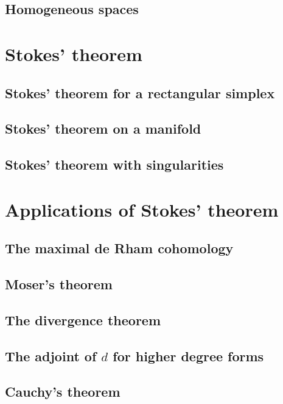 \documentclass[a4paper]{article}
\begin{document}
\subsection{Homogeneous spaces}

\section{Stokes' theorem}

\subsection{Stokes' theorem for a rectangular simplex}

\subsection{Stokes' theorem on a manifold}

\subsection{Stokes' theorem with singularities}

\section{Applications of Stokes' theorem}

\subsection{The maximal de Rham cohomology}

\subsection{Moser's theorem}

\subsection{The divergence theorem}

\subsection{The adjoint of $d$ for higher degree forms}

\subsection{Cauchy's theorem}
\end{document}
